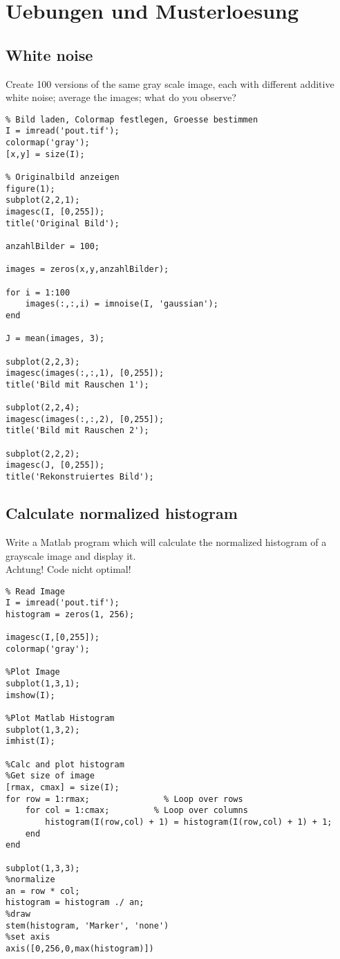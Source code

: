 \section{Uebungen und Musterloesung}
\lstset{language=Matlab}
\subsection{White noise}
Create 100 versions of the same gray scale image, each with different additive
white noise; average the images; what do you observe?
\begin{lstlisting}
% Bild laden, Colormap festlegen, Groesse bestimmen
I = imread('pout.tif');
colormap('gray');
[x,y] = size(I);

% Originalbild anzeigen
figure(1);
subplot(2,2,1);
imagesc(I, [0,255]);
title('Original Bild');

anzahlBilder = 100;

images = zeros(x,y,anzahlBilder);

for i = 1:100
    images(:,:,i) = imnoise(I, 'gaussian');
end

J = mean(images, 3);

subplot(2,2,3);
imagesc(images(:,:,1), [0,255]);
title('Bild mit Rauschen 1');

subplot(2,2,4);
imagesc(images(:,:,2), [0,255]);
title('Bild mit Rauschen 2');

subplot(2,2,2);
imagesc(J, [0,255]);
title('Rekonstruiertes Bild');
\end{lstlisting}
\subsection{Calculate normalized histogram}
Write a Matlab program which will calculate the normalized histogram of a
grayscale image and display it. \\
Achtung! Code nicht optimal!
\begin{lstlisting}
% Read Image
I = imread('pout.tif');
histogram = zeros(1, 256);

imagesc(I,[0,255]);
colormap('gray');

%Plot Image
subplot(1,3,1);
imshow(I);

%Plot Matlab Histogram
subplot(1,3,2);
imhist(I);

%Calc and plot histogram
%Get size of image
[rmax, cmax] = size(I);
for row = 1:rmax;               % Loop over rows
    for col = 1:cmax;         % Loop over columns
        histogram(I(row,col) + 1) = histogram(I(row,col) + 1) + 1;
    end
end

subplot(1,3,3);
%normalize
an = row * col;
histogram = histogram ./ an;
%draw
stem(histogram, 'Marker', 'none')
%set axis
axis([0,256,0,max(histogram)])
\end{lstlisting}
